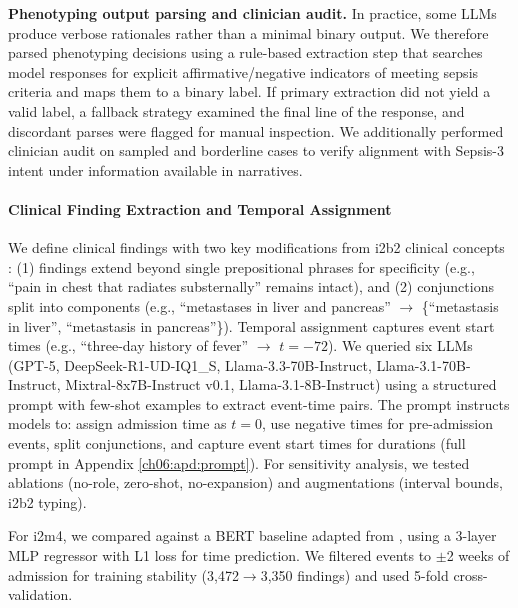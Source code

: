 \textbf{Phenotyping output parsing and clinician audit.}
In practice, some LLMs produce verbose rationales rather than a minimal binary output.
We therefore parsed phenotyping decisions using a rule-based extraction step that searches model responses for explicit affirmative/negative indicators of meeting sepsis criteria and maps them to a binary label.
If primary extraction did not yield a valid label, a fallback strategy examined the final line of the response, and discordant parses were flagged for manual inspection.
We additionally performed clinician audit on sampled and borderline cases to verify alignment with Sepsis-3 intent under information available in narratives.


\paragraph{Clinical Finding Extraction and Temporal Assignment}
We define clinical findings with two key modifications from i2b2 clinical concepts \citep{ch06:uzuner20112010}: (1) findings extend beyond single prepositional phrases for specificity (e.g., ``pain in chest that radiates substernally'' remains intact), and (2) conjunctions split into components (e.g., ``metastases in liver and pancreas'' $\rightarrow$ \{``metastasis in liver'', ``metastasis in pancreas''\}).
Temporal assignment captures event start times (e.g., ``three-day history of fever'' $\rightarrow$ $t=-72$).
We queried six LLMs (GPT-5, DeepSeek-R1-UD-IQ1\_S, Llama-3.3-70B-Instruct, Llama-3.1-70B-Instruct, Mixtral-8x7B-Instruct v0.1, Llama-3.1-8B-Instruct) using a structured prompt with few-shot examples to extract event-time pairs.
The prompt instructs models to: assign admission time as $t=0$, use negative times for pre-admission events, split conjunctions, and capture event start times for durations (full prompt in Appendix \ref{ch06:apd:prompt}).
For sensitivity analysis, we tested ablations (no-role, zero-shot, no-expansion) and augmentations (interval bounds, i2b2 typing).

For i2m4, we compared against a BERT baseline adapted from \cite{ch06:frattallone2024using}, using a 3-layer MLP regressor with L1 loss for time prediction.
We filtered events to $\pm$2 weeks of admission for training stability (3,472$\rightarrow$3,350 findings) and used 5-fold cross-validation.
